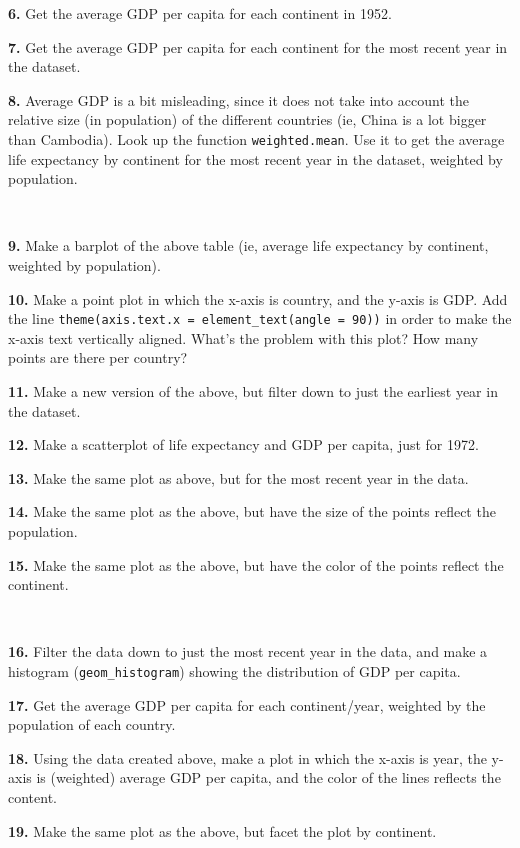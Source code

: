 \documentclass[
]{book}
\begin{document}
\textbf{6.} Get the average GDP per capita for each continent in 1952.

\textbf{7.} Get the average GDP per capita for each continent for the most recent year in the dataset.

\textbf{8.} Average GDP is a bit misleading, since it does not take into account the relative size (in population) of the different countries (ie, China is a lot bigger than Cambodia). Look up the function \texttt{weighted.mean}. Use it to get the average life expectancy by continent for the most recent year in the dataset, weighted by population.

~

\textbf{9.} Make a barplot of the above table (ie, average life expectancy by continent, weighted by population).

\textbf{10.} Make a point plot in which the x-axis is country, and the y-axis is GDP. Add the line \texttt{theme(axis.text.x\ =\ element\_text(angle\ =\ 90))} in order to make the x-axis text vertically aligned. What's the problem with this plot? How many points are there per country?

\textbf{11.} Make a new version of the above, but filter down to just the earliest year in the dataset.

\textbf{12.} Make a scatterplot of life expectancy and GDP per capita, just for 1972.

\textbf{13.} Make the same plot as above, but for the most recent year in the data.

\textbf{14.} Make the same plot as the above, but have the size of the points reflect the population.

\textbf{15.} Make the same plot as the above, but have the color of the points reflect the continent.

~

\textbf{16.} Filter the data down to just the most recent year in the data, and make a histogram (\texttt{geom\_histogram}) showing the distribution of GDP per capita.

\textbf{17.} Get the average GDP per capita for each continent/year, weighted by the population of each country.

\textbf{18.} Using the data created above, make a plot in which the x-axis is year, the y-axis is (weighted) average GDP per capita, and the color of the lines reflects the content.

\textbf{19.} Make the same plot as the above, but facet the plot by continent.
\end{document}
